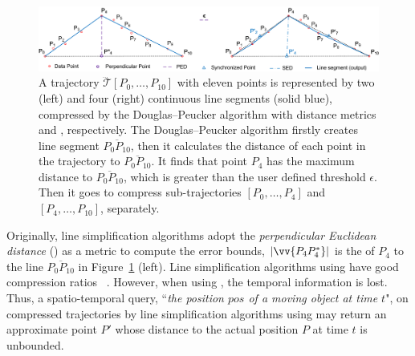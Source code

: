 \begin{figure}[tb!]
\centering
\vspace{-1ex}
\includegraphics[scale=0.76]{figures/Fig-DP.png}
\vspace{-1ex}
\caption{\small A trajectory $\dddot{\mathcal{T}}[P_0, \ldots, P_{10}]$  with eleven points is represented by two (left) and four (right) continuous line segments (solid blue), compressed by the Douglas--Peucker algorithm \cite{Douglas:Peucker} with distance metrics \ped and \sed, respectively.
The Douglas--Peucker algorithm firstly creates line segment $\overline{P_0P_{10}}$, then it calculates the distance of each point in the trajectory to $\overline{P_0P_{10}}$. It finds that point $P_{4}$ has the maximum distance to $\overline{P_0P_{10}}$, which is greater than the user defined threshold $\epsilon$. Then it goes to compress sub-trajectories $[P_0, \ldots, P_{4}]$ and $[P_{4}, \ldots, P_{10}]$, separately.
}
\vspace{-2ex}
\label{fig:notations}
\end{figure}


Originally, line simplification algorithms adopt the \emph{perpendicular Euclidean distance} (\ped) as a metric to compute the error bounds,
\eg $|\vv{P_4P^*_4}|$ is the \ped of $P_4$ to the line $\overline{P_0P_{10}}$ in Figure~\ref{fig:notations} (left).
Line simplification algorithms using \ped have good compression ratios~ \cite{Douglas:Peucker, Hershberger:Speeding, Liu:BQS, Muckell:Compression, Chen:Trajectory, Cao:Spatio, Shi:Survey}.  However, when using \ped, the temporal information is lost. Thus, a spatio-temporal query, \eg ``\emph{the position $pos$ of a moving object at time $t$}", on  compressed trajectories by line simplification algorithms using \ped may return an approximate point $P'$ whose distance to the actual position $P$ at time $t$ is unbounded. %


